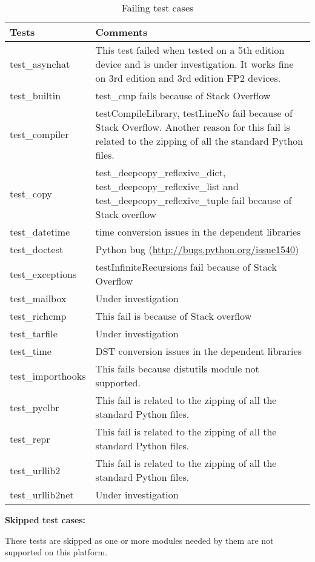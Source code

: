 \begin{table}[htbp]
\begin{center}
\begin{tabular}{l|l}
\hline
Tests & Comments \\
\hline
test_asynchat & This test failed when tested on a 5th edition device and is under investigation. It works fine on 3rd edition and 3rd edition FP2 devices. \\
test_builtin & test_cmp fails because of Stack Overflow \\
test_compiler & testCompileLibrary, testLineNo fail because of Stack Overflow. Another reason for this fail is related to the zipping of all the standard Python files. \\
test_copy & test_deepcopy_reflexive_dict, test_deepcopy_reflexive_list and test_deepcopy_reflexive_tuple fail because of Stack overflow \\
test_datetime & time conversion issues in the dependent libraries \\
test_doctest & Python bug (\url{http://bugs.python.org/issue1540}) \\
test_exceptions & testInfiniteRecursions fail because of Stack Overflow \\
test_mailbox & Under investigation \\
test_richcmp & This fail is because of Stack overflow \\
test_tarfile & Under investigation \\
test_time & DST conversion issues in the dependent libraries \\
test_importhooks & This fails because distutils module not supported. \\
test_pyclbr & This fail is related to the zipping of all the standard Python files. \\
test_repr & This fail is related to the zipping of all the standard Python files. \\
test_urllib2 & This fail is related to the zipping of all the standard Python files. \\
test_urllib2net & Under investigation \\
\hline
\end{tabular}
\caption{Failing test cases}
\label{tab:image2d}
\end{center}
\end{table}


{\bf Skipped test cases:} 

These tests are skipped as one or more modules needed by them are not supported on this platform.

